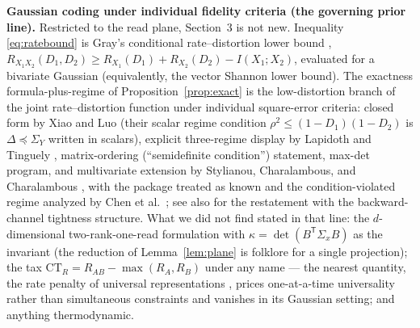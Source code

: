 \documentclass[11pt]{article}
\begin{document}
\textbf{Gaussian coding under individual fidelity criteria (the governing
prior line).} Restricted to the read plane, Section~3 is not new.
Inequality \eqref{eq:ratebound} is Gray's conditional rate--distortion lower
bound \cite{gray1973}, $R_{X_1X_2}(D_1,D_2)\ge
R_{X_1}(D_1)+R_{X_2}(D_2)-I(X_1;X_2)$, evaluated for a bivariate Gaussian
(equivalently, the vector Shannon lower bound). The exactness
formula-plus-regime of Proposition~\ref{prop:exact} is the low-distortion
branch of the joint rate--distortion function under individual square-error
criteria: closed form by Xiao and Luo \cite[Thm.~6]{xiaoluo2005} (their
scalar regime condition $\rho^2\le(1-D_1)(1-D_2)$ is
$\Delta\preceq\Sigma_Y$ written in scalars), explicit three-regime display
by Lapidoth and Tinguely \cite[Thm.~III.1]{lapidothtinguely2010},
matrix-ordering (``semidefinite condition'') statement, max-det program,
and multivariate extension by Stylianou, Charalambous, and Charalambous
\cite{stylianou2021}, with the package treated as known and the
condition-violated regime analyzed by Chen et al.\ \cite{chen2026}; see
also \cite{nayak2008} for the restatement with the backward-channel
tightness structure. What we did not find stated in that line: the
$d$-dimensional two-rank-one-read formulation with
$\kappa=\det(B^{\mathsf T}\Sigma_xB)$ as the invariant (the reduction of
Lemma~\ref{lem:plane} is folklore for a single projection); the tax
$\mathrm{CT}_R=R_{AB}-\max(R_A,R_B)$ under any name --- the nearest
quantity, the rate penalty of universal representations \cite{nguyen2025},
prices one-at-a-time universality rather than simultaneous constraints and
vanishes in its Gaussian setting; and anything thermodynamic.
\end{document}
